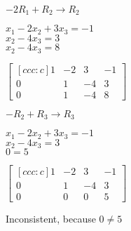\documentclass[letterpaper,12pt,fleqn]{article}
\begin{document}
\begin{example}
  \bigskip

  $-2R_1+R_2\rightarrow R_2$

  \begin{minipage}[t]{2in}
    \vspace{0pt}
    $x_1-2x_2+3x_3=-1$ \\
    $x_2-4x_3=3$ \\
    $x_2-4x_3=8$
  \end{minipage}
  \begin{minipage}[t]{2in}
    \vspace{0pt}
    $\begin{bmatrix}[ccc:c]
      1 & -2 & 3 & -1 \\
      0 & 1 & -4 & 3 \\
      0 & 1 & -4 & 8
    \end{bmatrix}$
  \end{minipage}

  \bigskip

  $-R_2+R_3\rightarrow R_3$

  \begin{minipage}[t]{2in}
    \vspace{0pt}
    $x_1-2x_2+3x_3=-1$ \\
    $x_2-4x_3=3$ \\
    $0=5$
  \end{minipage}
  \begin{minipage}[t]{2in}
    \vspace{0pt}
    $\begin{bmatrix}[ccc:c]
      1 & -2 & 3 & -1 \\
      0 & 1 & -4 & 3 \\
      0 & 0 & 0 & 5
    \end{bmatrix}$
  \end{minipage}

  Inconsistent, because $0\ne5$
\end{example}
\end{document}
